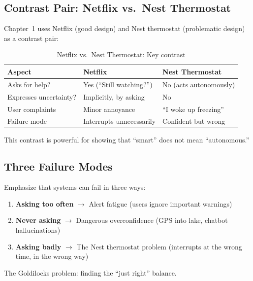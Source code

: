 \subsection{Contrast Pair: Netflix vs.\ Nest Thermostat}

Chapter~1 uses Netflix (good design) and Nest thermostat (problematic design) as a contrast pair:

\begin{table}[htbp]
\caption{Netflix vs.\ Nest Thermostat: Key contrast}
\label{tab:netflix-nest-contrast}
\centering
\begin{tabular}{@{}lll@{}}
\toprule
\textbf{Aspect} & \textbf{Netflix} & \textbf{Nest Thermostat} \\
\midrule
Asks for help? & Yes (``Still watching?'') & No (acts autonomously) \\
Expresses uncertainty? & Implicitly, by asking & No \\
User complaints & Minor annoyance & ``I woke up freezing'' \\
Failure mode & Interrupts unnecessarily & Confident but wrong \\
\bottomrule
\end{tabular}
\end{table}

\begin{technote}
This contrast is powerful for showing that ``smart'' does not mean ``autonomous.''
\end{technote}

\subsection{Three Failure Modes}

Emphasize that systems can fail in three ways:
\begin{enumerate}
    \item \textbf{Asking too often} $\rightarrow$ Alert fatigue (users ignore important warnings)
    \item \textbf{Never asking} $\rightarrow$ Dangerous overconfidence (GPS into lake, chatbot hallucinations)
    \item \textbf{Asking badly} $\rightarrow$ The Nest thermostat problem (interrupts at the wrong time, in the wrong way)
\end{enumerate}

The Goldilocks problem: finding the ``just right'' balance.

